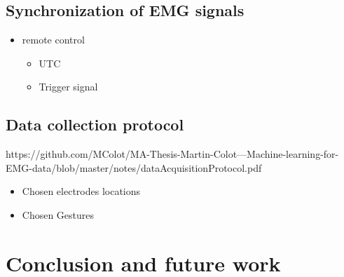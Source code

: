\documentclass{article}
\begin{document}
\subsection{Synchronization of EMG signals}

\begin{itemize}
    \item remote control
    \begin{itemize}
        \item UTC
        \item Trigger signal
    \end{itemize}
\end{itemize}


\subsection{Data collection protocol}
https://github.com/MColot/MA-Thesis-Martin-Colot---Machine-learning-for-EMG-data/blob/master/notes/dataAcquisitionProtocol.pdf

\begin{itemize}
    \item Chosen electrodes locations
    \item Chosen Gestures
\end{itemize}

\section{Conclusion and future work}
\end{document}
